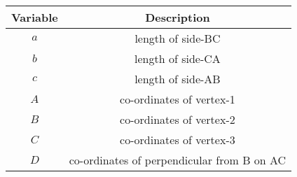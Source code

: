 \begin{tabular}[12pt]{ |c| c|}
    \hline
    \textbf{Variable} & \textbf{Description}\\ 
    \hline
    $a$ & length of side-BC \\
    \hline 
    $b$ & length of side-CA \\
    \hline
     $c$ & length of side-AB \\
     \hline
     $A$ & co-ordinates of vertex-1 \\
    \hline
    $B$ & co-ordinates of vertex-2 \\
    \hline
    $C$ & co-ordinates of vertex-3 \\
    \hline
    $D$ & co-ordinates of perpendicular from B on AC \\
    \hline
    \end{tabular}
